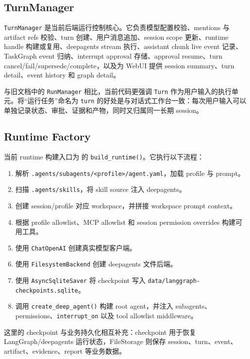 \documentclass[UTF8,zihao=-4,a4paper,fontset=none]{ctexart}
\newcommand{\code}[1]{\texttt{\footnotesize #1}}
\begin{document}
\subsection{TurnManager}

\code{TurnManager} 是当前后端运行控制核心。它负责模型配置校验、mentions 与 artifact refs 校验、turn 创建、用户消息追加、session scope 更新、runtime handle 构建或复用、deepagents stream 执行、assistant chunk live event 记录、TaskGraph event 归纳、interrupt approval 存储、approval resume、turn cancel/fail/supersede/complete，以及为 WebUI 提供 session summary、turn detail、event history 和 graph detail。

与旧文档中的 \code{RunManager} 相比，当前代码更强调 \code{Turn} 作为用户输入的执行单元。将“运行任务”命名为 \code{turn} 的好处是与对话式工作台一致：每次用户输入可以单独记录状态、审批、证据和产物，同时又归属同一长期 session。

\subsection{Runtime Factory}

当前 runtime 构建入口为  的 \code{build\_runtime()}。它执行以下流程：

\begin{enumerate}
  \item 解析 \code{.agents/subagents/<profile>/agent.yaml}，加载 profile 与 prompt。
  \item 扫描 \code{.agents/skills}，将 skill source 注入 deepagents。
  \item 创建 session/profile 对应 workspace，并拼接 workspace prompt context。
  \item 根据 profile allowlist、MCP allowlist 和 session permission overrides 构建可用工具。
  \item 使用 \code{ChatOpenAI} 创建真实模型客户端。
  \item 使用 \code{FilesystemBackend} 创建 deepagents 文件后端。
  \item 使用 \code{AsyncSqliteSaver} 将 checkpoint 写入 \code{data/langgraph-checkpoints.sqlite}。
  \item 调用 \code{create\_deep\_agent()} 构建 root agent，并注入 subagents、permissions、\code{interrupt\_on} 以及 tool allowlist middleware。
\end{enumerate}

这里的 checkpoint 与业务持久化相互补充：checkpoint 用于恢复 LangGraph/deepagents 运行状态，FileStorage 则保存 session、turn、event、artifact、evidence、report 等业务数据。
\end{document}
